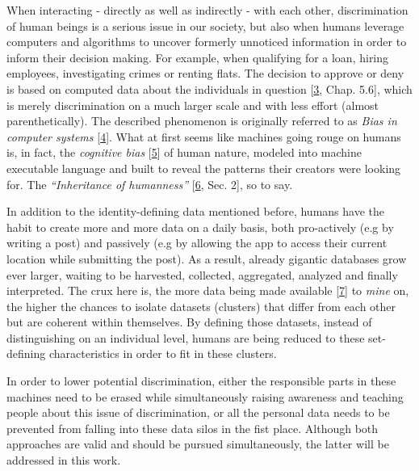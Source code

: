 \documentclass[12pt,english,a4paper,titlepage,cleardoublepage=empty,dottedtoc]{report}
\begin{document}
When interacting - directly as well as indirectly - with each other,
discrimination of human beings is a serious issue in our society, but
also when humans leverage computers and algorithms to uncover formerly
unnoticed information in order to inform their decision making. For
example, when qualifying for a loan, hiring employees, investigating
crimes or renting flats. The decision to approve or deny is based on
computed data about the individuals in question
{[}\protect\hyperlink{ref-book_2015_ethical-it-innovation}{3}, Chap.
5.6{]}, which is merely discrimination on a much larger scale and with
less effort (almost parenthetically). The described phenomenon is
originally referred to as \emph{Bias in computer systems}
{[}\protect\hyperlink{ref-paper_1996_bias-in-computer-systems}{4}{]}.
What at first seems like machines going rouge on humans is, in fact, the
\emph{cognitive bias}
{[}\protect\hyperlink{ref-wikipedia_2016_cognitive-bias}{5}{]} of human
nature, modeled into machine executable language and built to reveal the
patterns their creators were looking for. The \emph{``Inheritance of
humanness''} {[}\protect\hyperlink{ref-web_2016_big-data-is-people}{6},
Sec. 2{]}, so to say.

In addition to the identity-defining data mentioned before, humans have
the habit to create more and more data on a daily basis, both
pro-actively (e.g by writing a post) and passively (e.g by allowing the
app to access their current location while submitting the post). As a
result, already gigantic databases grow ever larger, waiting to be
harvested, collected, aggregated, analyzed and finally interpreted. The
crux here is, the more data being made available
{[}\protect\hyperlink{ref-video_2015_big-data-and-deep-learning_discrimination}{7}{]}
to \emph{mine} on, the higher the chances to isolate datasets (clusters)
that differ from each other but are coherent within themselves. By
defining those datasets, instead of distinguishing on an individual
level, humans are being reduced to these set-defining characteristics in
order to fit in these clusters.

In order to lower potential discrimination, either the responsible parts
in these machines need to be erased while simultaneously raising
awareness and teaching people about this issue of discrimination, or all
the personal data needs to be prevented from falling into these data
silos in the fist place. Although both approaches are valid and should
be pursued simultaneously, the latter will be addressed in this work.
\end{document}
